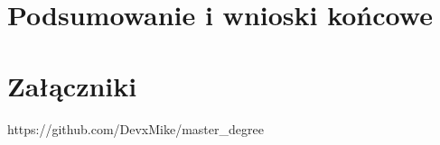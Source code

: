 \documentclass[12pt,twoside]{article}
\begin{document}
\section{Podsumowanie i wnioski końcowe}



\section*{Załączniki}



\clearpage


\begin{thebibliography}{4}
 https://github.com/DevxMike/master\_degree
\end{thebibliography}

\clearpage

\makesummary
\end{document}
